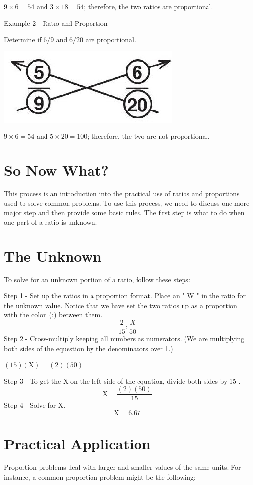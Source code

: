 \documentclass[10pt]{article}
\begin{document}
$9 \times 6=54$ and $3 \times 18=54$; therefore, the two ratios are proportional.

Example 2 - Ratio and Proportion

Determine if $5 / 9$ and $6 / 20$ are proportional.

\includegraphics[max width=\textwidth]{2022_09_11_72dbedc910e6e984560cg-47(1)}

$9 \times 6=54$ and $5 \times 20=100$; therefore, the two are not proportional.

\section{So Now What?}
This process is an introduction into the practical use of ratios and proportions used to solve common problems. To use this process, we need to discuss one more major step and then provide some basic rules. The first step is what to do when one part of a ratio is unknown.

\section{The Unknown}
To solve for an unknown portion of a ratio, follow these steps:

Step 1 - Set up the ratios in a proportion format. Place an " $\mathrm{W}$ " in the ratio for the unknown value. Notice that we have set the two ratios up as a proportion with the colon (:) between them.
$$
\frac{2}{15}: \frac{X}{50}
$$
Step 2 - Cross-multiply keeping all numbers as numerators. (We are multiplying both sides of the equestion by the denominators over 1.)

$(15)(\mathrm{X})=(2)(50)$

Step 3 - To get the $\mathrm{X}$ on the left side of the equation, divide both sides by 15 .
$$
\mathrm{X}=\frac{(2)(50)}{15}
$$
Step 4 - Solve for X.
$$
\mathrm{X}=6.67
$$

\section{Practical Application}
Proportion problems deal with larger and smaller values of the same units. For instance, a common proportion problem might be the following:
\end{document}
